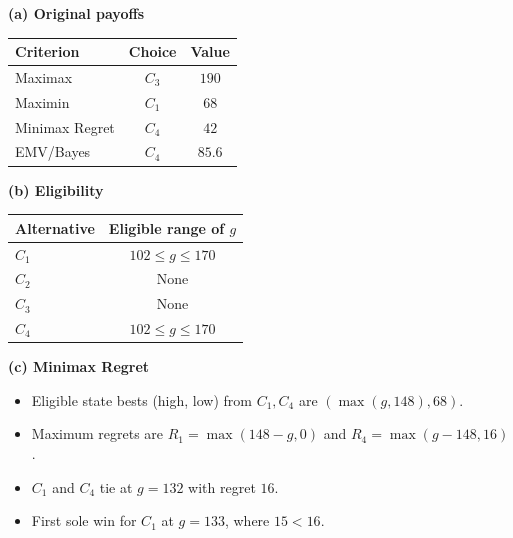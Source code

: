 {\noindent\begin{minipage}[t]{0.35\textwidth}
  \vspace{0pt}
  \textbf{(a) Original payoffs}\par\smallskip
  \setlength{\tabcolsep}{3pt}
  \begin{tabular}{@{}lcc@{}}
    \toprule
    Criterion & Choice & Value\\ \midrule
    Maximax & $C_3$ & $190$\\
    Maximin & $C_1$ & $68$\\
    Minimax Regret & $C_4$ & $42$\\
    EMV/Bayes & $C_4$ & $85.6$\\
    \bottomrule
  \end{tabular}
\end{minipage}\hfill
\begin{minipage}[t]{0.62\textwidth}
  \vspace{0pt}
  \textbf{(b) Eligibility}\par\smallskip
  \begin{tabular}{@{}lc@{}}
    \toprule
    Alternative & Eligible range of $g$\\ \midrule
    $C_1$ & $102\le g\le170$\\
    $C_2$ & None\\
    $C_3$ & None\\
    $C_4$ & $102\le g\le170$\\
    \bottomrule
  \end{tabular}\par\smallskip
  \textbf{(c) Minimax Regret}
  \begin{itemize}[leftmargin=*,nosep]
    \item Eligible state bests (high, low) from $C_1,C_4$ are $(\max(g,148),68)$.
    \item Maximum regrets are $R_1=\max(148-g,0)$ and $R_4=\max(g-148,16)$.
    \item $C_1$ and $C_4$ tie at $g=132$ with regret $16$.
    \item First sole win for $C_1$ at $\boxed{g=133}$, where $15<16$.
  \end{itemize}
\end{minipage}

}

